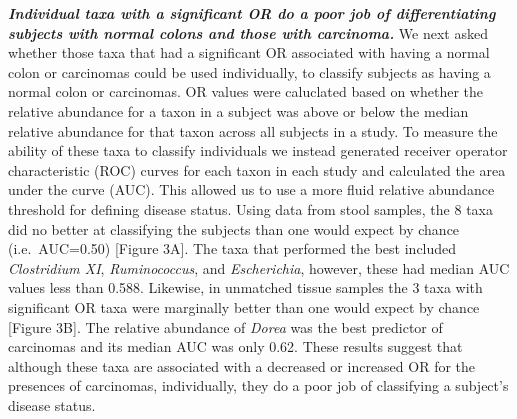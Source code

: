 \documentclass[12pt,]{article}
\begin{document}
\textbf{\emph{Individual taxa with a significant OR do a poor job of
differentiating subjects with normal colons and those with carcinoma.}}
We next asked whether those taxa that had a significant OR associated
with having a normal colon or carcinomas could be used individually, to
classify subjects as having a normal colon or carcinomas. OR values were
caluclated based on whether the relative abundance for a taxon in a
subject was above or below the median relative abundance for that taxon
across all subjects in a study. To measure the ability of these taxa to
classify individuals we instead generated receiver operator
characteristic (ROC) curves for each taxon in each study and calculated
the area under the curve (AUC). This allowed us to use a more fluid
relative abundance threshold for defining disease status. Using data
from stool samples, the 8 taxa did no better at classifying the subjects
than one would expect by chance (i.e.~AUC=0.50) {[}Figure 3A{]}. The
taxa that performed the best included \emph{Clostridium XI},
\emph{Ruminococcus}, and \emph{Escherichia}, however, these had median
AUC values less than 0.588. Likewise, in unmatched tissue samples the 3
taxa with significant OR taxa were marginally better than one would
expect by chance {[}Figure 3B{]}. The relative abundance of \emph{Dorea}
was the best predictor of carcinomas and its median AUC was only 0.62.
These results suggest that although these taxa are associated with a
decreased or increased OR for the presences of carcinomas, individually,
they do a poor job of classifying a subject's disease status.
\end{document}
